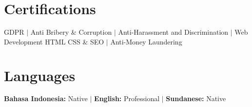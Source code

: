 \documentclass[a4paper, 11pt]{article}
\begin{document}
\section{Certifications}
 \begin{itemize}[leftmargin=0.1in, label={}]
    \small{\item{
     GDPR $|$ Anti Bribery \& Corruption $|$ Anti-Harassment and Discrimination $|$ Web Development HTML CSS \& SEO $|$ Anti-Money Laundering
    }}
 \end{itemize}

\section{Languages}
 \begin{itemize}[leftmargin=0.1in, label={}]
    \small{\item{
     \textbf{Bahasa Indonesia:} Native $|$ \textbf{English:} Professional $|$ \textbf{Sundanese:} Native
    }}
 \end{itemize}

\end{document}
